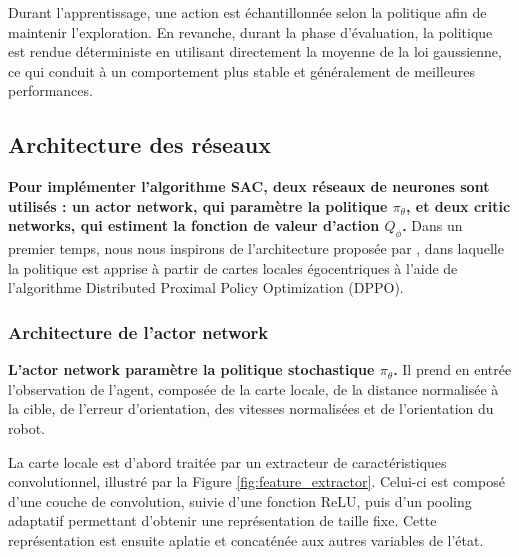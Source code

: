 \vspace{10pt}

\noindent Durant l'apprentissage, une action est échantillonnée selon la politique afin de maintenir l'exploration. En revanche, durant la phase d'évaluation, la politique est rendue déterministe en utilisant directement la moyenne de la loi gaussienne, ce qui conduit à un comportement plus stable et généralement de meilleures performances.




\subsection{Architecture des réseaux}

\noindent \textbf{Pour implémenter l'algorithme SAC, deux réseaux de neurones sont utilisés : un actor network, qui paramètre la politique $\pi_\theta$, et deux critic networks, qui estiment la fonction de valeur d'action $Q_\phi$.} Dans un premier temps, nous nous inspirons de l'architecture proposée par \cite{chen2020}, dans laquelle la politique est apprise à partir de cartes locales égocentriques à l'aide de l'algorithme Distributed Proximal Policy Optimization (DPPO).



\subsubsection{Architecture de l'actor network}

\noindent \textbf{L’actor network paramètre la politique stochastique $\pi_\theta$.} Il prend en entrée l’observation de l’agent, composée de la carte locale, de la distance normalisée à la cible, de l’erreur d’orientation, des vitesses normalisées et de l’orientation du robot.

\vspace{10pt}

\noindent La carte locale est d'abord traitée par un extracteur de caractéristiques convolutionnel, illustré par la Figure \ref{fig:feature_extractor}. Celui-ci est composé d'une couche de convolution, suivie d'une fonction ReLU, puis d'un pooling adaptatif permettant d'obtenir une représentation de taille fixe. Cette représentation est ensuite aplatie et concaténée aux autres variables de l'état.

